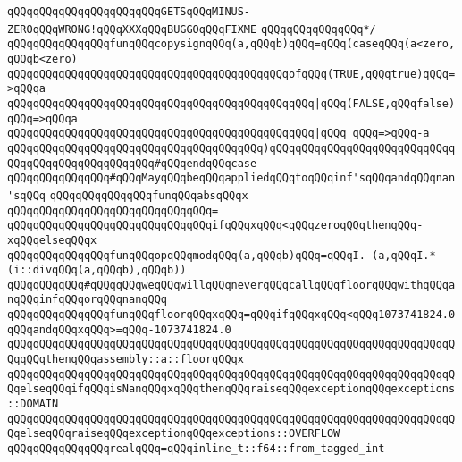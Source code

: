 \verb|qQQqqQQqqQQqqQQqqQQqqQQqGETSqQQqMINUS-ZEROqQQqWRONG!qQQqXXXqQQqBUGGOqQQqFIXME|\newline
\verb|qQQqqQQqqQQqqQQq*/|\newline
\verb|qQQqqQQqqQQqqQQqfunqQQqcopysignqQQq(a,qQQqb)qQQq=qQQq(caseqQQq(a<zero,qQQqb<zero)|\newline
\verb|qQQqqQQqqQQqqQQqqQQqqQQqqQQqqQQqqQQqqQQqqQQqofqQQq(TRUE,qQQqtrue)qQQq=>qQQqa|\newline
\verb|qQQqqQQqqQQqqQQqqQQqqQQqqQQqqQQqqQQqqQQqqQQqqQQq|\verb#|qQQq(FALSE,qQQqfalse)qQQq=>qQQqa#\newline
\verb|qQQqqQQqqQQqqQQqqQQqqQQqqQQqqQQqqQQqqQQqqQQqqQQq|\verb#|qQQq_qQQq=>qQQq-a#\newline
\verb|qQQqqQQqqQQqqQQqqQQqqQQqqQQqqQQqqQQqqQQq)qQQqqQQqqQQqqQQqqQQqqQQqqQQqqQQqqQQqqQQqqQQqqQQqqQQq#qQQqendqQQqcase|\newline
\newline
\verb|qQQqqQQqqQQqqQQq#qQQqMayqQQqbeqQQqappliedqQQqtoqQQqinf'sqQQqandqQQqnan'sqQQq|\newline
\newline
\verb|qQQqqQQqqQQqqQQqfunqQQqabsqQQqx|\newline
\verb|qQQqqQQqqQQqqQQqqQQqqQQqqQQqqQQq=|\newline
\verb|qQQqqQQqqQQqqQQqqQQqqQQqqQQqqQQqifqQQqxqQQq<qQQqzeroqQQqthenqQQq-xqQQqelseqQQqx|\newline
\newline
\verb|qQQqqQQqqQQqqQQqfunqQQqopqQQqmodqQQq(a,qQQqb)qQQq=qQQqI.-(a,qQQqI.*(i::divqQQq(a,qQQqb),qQQqb))|\newline
\newline
\verb|qQQqqQQqqQQq#qQQqqQQqweqQQqwillqQQqneverqQQqcallqQQqfloorqQQqwithqQQqanqQQqinfqQQqorqQQqnanqQQq|\newline
\verb|qQQqqQQqqQQqqQQqfunqQQqfloorqQQqxqQQq=qQQqifqQQqxqQQq<qQQq1073741824.0qQQqandqQQqxqQQq>=qQQq-1073741824.0|\newline
\verb|qQQqqQQqqQQqqQQqqQQqqQQqqQQqqQQqqQQqqQQqqQQqqQQqqQQqqQQqqQQqqQQqqQQqqQQqqQQqthenqQQqassembly::a::floorqQQqx|\newline
\verb|qQQqqQQqqQQqqQQqqQQqqQQqqQQqqQQqqQQqqQQqqQQqqQQqqQQqqQQqqQQqqQQqqQQqqQQqelseqQQqifqQQqisNanqQQqxqQQqthenqQQqraiseqQQqexceptionqQQqexceptions::DOMAIN|\newline
\verb|qQQqqQQqqQQqqQQqqQQqqQQqqQQqqQQqqQQqqQQqqQQqqQQqqQQqqQQqqQQqqQQqqQQqqQQqelseqQQqraiseqQQqexceptionqQQqexceptions::OVERFLOW|\newline
\verb|qQQqqQQqqQQqqQQqrealqQQq=qQQqinline_t::f64::from_tagged_int|\newline
